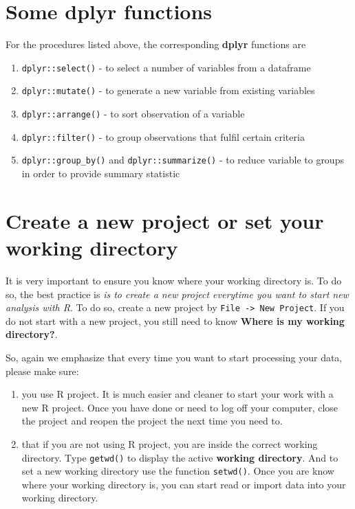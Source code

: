 \documentclass[
  10pt,
]{krantz}
\providecommand{\tightlist}{%
  \setlength{\itemsep}{0pt}\setlength{\parskip}{0pt}}
\begin{document}
\hypertarget{some-dplyr-functions}{%
\section{\texorpdfstring{Some \textbf{dplyr} functions}{Some dplyr functions}}\label{some-dplyr-functions}}

For the procedures listed above, the corresponding \textbf{dplyr} functions are

\begin{enumerate}
\def\labelenumi{\arabic{enumi}.}
\tightlist
\item
  \texttt{dplyr::select()} - to select a number of variables from a dataframe
\item
  \texttt{dplyr::mutate()} - to generate a new variable from existing variables
\item
  \texttt{dplyr::arrange()} - to sort observation of a variable
\item
  \texttt{dplyr::filter()} - to group observations that fulfil certain criteria
\item
  \texttt{dplyr::group\_by()} and \texttt{dplyr::summarize()} - to reduce variable to groups in order to provide summary statistic
\end{enumerate}

\hypertarget{create-a-new-project-or-set-your-working-directory}{%
\section{Create a new project or set your working directory}\label{create-a-new-project-or-set-your-working-directory}}

It is very important to ensure you know where your working directory is. To do so, the best practice is \emph{is to create a new project everytime you want to start new analysis with R}. To do so, create a new project by \texttt{File\ -\textgreater{}\ New\ Project}. If you do not start with a new project, you still need to know \textbf{Where is my working directory?}.

So, again we emphasize that every time you want to start processing your data, please make sure:

\begin{enumerate}
\def\labelenumi{\arabic{enumi}.}
\tightlist
\item
  you use R project. It is much easier and cleaner to start your work with a new R project. Once you have done or need to log off your computer, close the project and reopen the project the next time you need to.\\
\item
  that if you are not using R project, you are inside the correct working directory. Type \texttt{getwd()} to display the active \textbf{working directory}. And to set a new working directory use the function \texttt{setwd()}. Once you are know where your working directory is, you can start read or import data into your working directory.
\end{enumerate}
\end{document}
